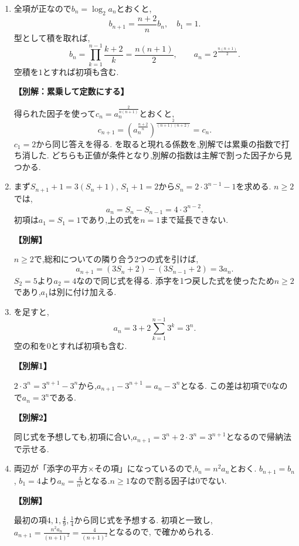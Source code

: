 \begin{enumerate}[label=\textbf{問\arabic*.},leftmargin=3.8em,format=\bookitemlink{practice-basic}{solution}{problem}]
  \item {}\BookMathLayout{}{\\}
    全項が正なので$b_n=\log_2a_n$とおくと,
    \[
      b_{n+1}=\frac{n+2}{n}b_n,\quad b_1=1.
    \]
    型として積を取れば,
    \[
      b_n=\prod_{k=1}^{n-1}\frac{k+2}{k}=\frac{n(n+1)}2,
      \qquad a_n=2^{\frac{n(n+1)}2}.
    \]
    空積を$1$とすれば初項も含む.
    \par\smallskip\noindent\textbf{【別解：累乗して定数にする】}\par
    得られた因子を使って$c_n=a_n^{\frac{2}{n(n+1)}}$とおくと,
    \[
      c_{n+1}
      =\left(a_n^{\frac{n+2}{n}}\right)^{\frac2{(n+1)(n+2)}}
      =c_n.
    \]
    $c_1=2$から同じ答えを得る.
    を取ると現れる係数を,別解では累乗の指数で打ち消した.
    どちらも正値が条件となり,別解の指数は主解で割った因子から見つかる.

  \item {}\BookMathLayout{}{\\}
    まず$S_{n+1}+1=3(S_n+1)$, $S_1+1=2$から$S_n=2\cdot3^{n-1}-1$を求める.
    $n\ge2$では,
    \[
      a_n=S_n-S_{n-1}=4\cdot3^{n-2}.
    \]
    初項は$a_1=S_1=1$であり,上の式を$n=1$まで延長できない.
    \par\smallskip\noindent\textbf{【別解】}\par
    $n\ge2$で,総和についての隣り合う2つの式を引けば,
    \[
      a_{n+1}=(3S_n+2)-(3S_{n-1}+2)=3a_n.
    \]
    $S_2=5$より$a_2=4$なので同じ式を得る.
    添字を1つ戻した式を使ったため$n\ge2$であり,$a_1$は別に付け加える.

  \item {}\BookMathLayout{}{\\}
    を足すと,
    \[
      a_n=3+2\sum_{k=1}^{n-1}3^k=3^n.
    \]
    空の和を$0$とすれば初項も含む.
    \par\smallskip\noindent\textbf{【別解1】}\par
    $2\cdot3^n=3^{n+1}-3^n$から,$a_{n+1}-3^{n+1}=a_n-3^n$となる.
    この差は初項で$0$なので$a_n=3^n$である.
    \par\smallskip\noindent\textbf{【別解2】}\par
    同じ式を予想しても,初項に合い,$a_{n+1}=3^n+2\cdot3^n=3^{n+1}$となるので帰納法で示せる.

  \item {}\BookMathLayout{}{\\}
    両辺が「添字の平方×その項」になっているので,$b_n=n^2a_n$とおく.
    $b_{n+1}=b_n$, $b_1=4$より$a_n=\frac{4}{n^2}$となる.$n\ge1$なので割る因子は0でない.
    \par\smallskip\noindent\textbf{【別解】}\par
    最初の項$4,1,\frac{4}{9},\frac{1}{4}$から同じ式を予想する.
    初項と一致し,$a_{n+1}=\frac{n^2a_n}{(n+1)^2}=\frac{4}{(n+1)^2}$となるので,
    で確かめられる.


\end{enumerate}
